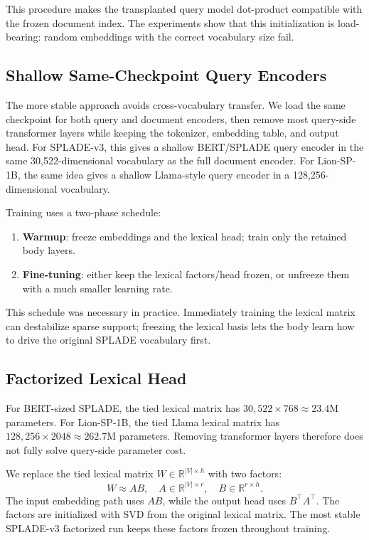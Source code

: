 \documentclass[
]{ceurart}
\begin{document}
This procedure makes the transplanted query model dot-product compatible with
the frozen document index. The experiments show that this initialization is
load-bearing: random embeddings with the correct vocabulary size fail.

\subsection{Shallow Same-Checkpoint Query Encoders}

The more stable approach avoids cross-vocabulary transfer. We load the same
checkpoint for both query and document encoders, then remove most query-side
transformer layers while keeping the tokenizer, embedding table, and output
head. For SPLADE-v3, this gives a shallow BERT/SPLADE query encoder in the same
30,522-dimensional vocabulary as the full document encoder. For Lion-SP-1B, the
same idea gives a shallow Llama-style query encoder in a 128,256-dimensional
vocabulary.

Training uses a two-phase schedule:
\begin{enumerate}
  \item \textbf{Warmup}: freeze embeddings and the lexical head; train only the
  retained body layers.
  \item \textbf{Fine-tuning}: either keep the lexical factors/head frozen, or
  unfreeze them with a much smaller learning rate.
\end{enumerate}

This schedule was necessary in practice. Immediately training the lexical
matrix can destabilize sparse support; freezing the lexical basis lets the body
learn how to drive the original SPLADE vocabulary first.

\subsection{Factorized Lexical Head}

For BERT-sized SPLADE, the tied lexical matrix has
$30{,}522 \times 768 \approx 23.4$M parameters. For Lion-SP-1B, the tied Llama
lexical matrix has $128{,}256 \times 2048 \approx 262.7$M parameters. Removing
transformer layers therefore does not fully solve query-side parameter cost.

We replace the tied lexical matrix $W \in \mathbb{R}^{|V| \times h}$ with two
factors:
\begin{equation}
  W \approx A B,\quad A \in \mathbb{R}^{|V| \times r},\quad
  B \in \mathbb{R}^{r \times h}.
\end{equation}
The input embedding path uses $A B$, while the output head uses $B^\top A^\top$.
The factors are initialized with SVD from the original lexical matrix. The most
stable SPLADE-v3 factorized run keeps these factors frozen throughout training.
\end{document}
